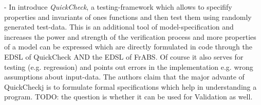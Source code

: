 - In \cite{claessen_quickcheck:_2000} introduce \textit{QuickCheck}, a testing-framework which allows to specifify properties and invariants of ones functions and then test them using randomly generated test-data. This is an additional tool of model-specification and increases the power and strength of the verification process and more properties of a model can be expressed which are directly formulated in code through the EDSL of QuickCheck AND the EDSL of FrABS. Of course it also serves for testing (e.g. regression) and points out errors in the implementation e.g. wrong assumptions about input-data. The authors claim that the major advante of QuickCheckj is to formulate formal specifications which help in understanding a program.
TODO: the question is whether it can be used for Validation as well.